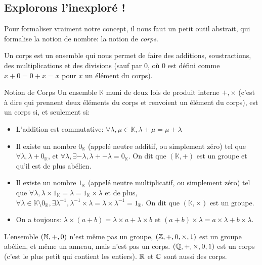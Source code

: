 \documentclass{classe}
\renewcommand*{\K}{\mathbb{K}}
\begin{document}
\subsection{Explorons l'inexploré !}

Pour formaliser vraiment notre concept, il nous faut un petit outil abstrait, qui formalise la notion de nombre: la notion de \emph{corps}.

Un corps est un ensemble qui nous permet de faire des additions, soustractions, des multiplications et des divisions (sauf par $0$, où $0$ est défini comme $x+0 = 0+x = x$ pour $x$ un élément du corps).

\begin{définition}{Notion de Corps}{}
	Un ensemble $\K$ muni de deux lois de produit interne $+, \times$ (c'est à dire qui prennent deux éléments du corps et renvoient un élément du corps), est un corps si, et seulement si:
	\begin{itemize}
		\item L'addition est commutative: $\forall \lambda, \mu \in \K, \lambda + \mu = \mu + \lambda$
		\item Il existe un nombre $0_{\K}$ (appelé neutre additif, ou simplement zéro) tel que $\forall \lambda, \lambda + 0_{\K}$, et $\forall \lambda, \exists -\lambda, \lambda + -\lambda = 0_{\K}$. On dit que $\left(\K, +\right)$ est un groupe et qu'il est de plus abélien.
		\item Il existe un nombre $1_{\K}$ (appelé neutre multiplicatif, ou simplement zéro) tel que $\forall \lambda, \lambda \times 1_{\K} = \lambda = 1_{\K} \times \lambda$ et de plus, $\forall \lambda \in \K\setminus 0_{\K}, \exists \lambda^{-1}, \lambda^{-1} \times \lambda = \lambda \times \lambda^{-1} = 1_{\K}$. On dit que $\left(\K, \times\right)$ est un groupe.
		\item On a toujours: $\lambda \times \left( a + b \right) = \lambda \times a + \lambda \times b$ et $\left( a + b\right)\times \lambda = a\times \lambda + b\times \lambda$.
	\end{itemize}
\end{définition}

\begin{example}
	L'ensemble $\left( \mathbb{N}, +, 0 \right)$ n'est même pas un groupe, $\left( \mathbb{Z}, +, 0, \times, 1 \right)$ est un groupe abélien, et même un anneau, mais n'est pas un corps. $\left( \mathbb{Q}, +, \times, 0, 1 \right)$ est un corps (c'est le plus petit qui contient les entiers). $\mathbb{R}$ et $\mathbb{C}$ sont aussi des corps.
\end{example}
\end{document}
